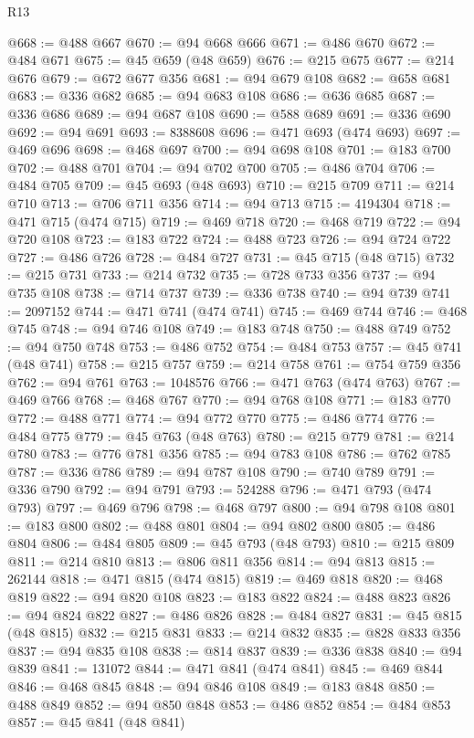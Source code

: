 \begin{lexlean}{R13}
\begin{coremodule}
@668 := @488 @667
@670 := @94 @668 @666
@671 := @486 @670
@672 := @484 @671
@675 := @45 @659 (@48 @659)
@676 := @215 @675
@677 := @214 @676
@679 := @672 @677 @356
@681 := @94 @679 @108
@682 := @658 @681
@683 := @336 @682
@685 := @94 @683 @108
@686 := @636 @685
@687 := @336 @686
@689 := @94 @687 @108
@690 := @588 @689
@691 := @336 @690
@692 := @94 @691
@693 := 8388608
@696 := @471 @693 (@474 @693)
@697 := @469 @696
@698 := @468 @697
@700 := @94 @698 @108
@701 := @183 @700
@702 := @488 @701
@704 := @94 @702 @700
@705 := @486 @704
@706 := @484 @705
@709 := @45 @693 (@48 @693)
@710 := @215 @709
@711 := @214 @710
@713 := @706 @711 @356
@714 := @94 @713
@715 := 4194304
@718 := @471 @715 (@474 @715)
@719 := @469 @718
@720 := @468 @719
@722 := @94 @720 @108
@723 := @183 @722
@724 := @488 @723
@726 := @94 @724 @722
@727 := @486 @726
@728 := @484 @727
@731 := @45 @715 (@48 @715)
@732 := @215 @731
@733 := @214 @732
@735 := @728 @733 @356
@737 := @94 @735 @108
@738 := @714 @737
@739 := @336 @738
@740 := @94 @739
@741 := 2097152
@744 := @471 @741 (@474 @741)
@745 := @469 @744
@746 := @468 @745
@748 := @94 @746 @108
@749 := @183 @748
@750 := @488 @749
@752 := @94 @750 @748
@753 := @486 @752
@754 := @484 @753
@757 := @45 @741 (@48 @741)
@758 := @215 @757
@759 := @214 @758
@761 := @754 @759 @356
@762 := @94 @761
@763 := 1048576
@766 := @471 @763 (@474 @763)
@767 := @469 @766
@768 := @468 @767
@770 := @94 @768 @108
@771 := @183 @770
@772 := @488 @771
@774 := @94 @772 @770
@775 := @486 @774
@776 := @484 @775
@779 := @45 @763 (@48 @763)
@780 := @215 @779
@781 := @214 @780
@783 := @776 @781 @356
@785 := @94 @783 @108
@786 := @762 @785
@787 := @336 @786
@789 := @94 @787 @108
@790 := @740 @789
@791 := @336 @790
@792 := @94 @791
@793 := 524288
@796 := @471 @793 (@474 @793)
@797 := @469 @796
@798 := @468 @797
@800 := @94 @798 @108
@801 := @183 @800
@802 := @488 @801
@804 := @94 @802 @800
@805 := @486 @804
@806 := @484 @805
@809 := @45 @793 (@48 @793)
@810 := @215 @809
@811 := @214 @810
@813 := @806 @811 @356
@814 := @94 @813
@815 := 262144
@818 := @471 @815 (@474 @815)
@819 := @469 @818
@820 := @468 @819
@822 := @94 @820 @108
@823 := @183 @822
@824 := @488 @823
@826 := @94 @824 @822
@827 := @486 @826
@828 := @484 @827
@831 := @45 @815 (@48 @815)
@832 := @215 @831
@833 := @214 @832
@835 := @828 @833 @356
@837 := @94 @835 @108
@838 := @814 @837
@839 := @336 @838
@840 := @94 @839
@841 := 131072
@844 := @471 @841 (@474 @841)
@845 := @469 @844
@846 := @468 @845
@848 := @94 @846 @108
@849 := @183 @848
@850 := @488 @849
@852 := @94 @850 @848
@853 := @486 @852
@854 := @484 @853
@857 := @45 @841 (@48 @841)

\end{coremodule}
\end{lexlean}
